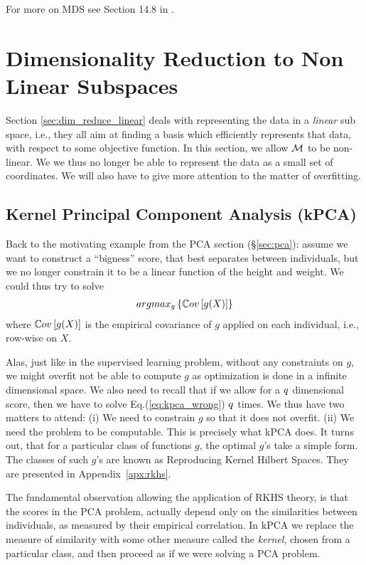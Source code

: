 For more on MDS see Section 14.8 in \cite{hastie_elements_2003}.


\section{Dimensionality Reduction to Non Linear Subspaces}
\label{sec:dim_reduce_nonlinear}

Section \ref{sec:dim_reduce_linear} deals with representing the data in a \emph{linear} sub space, i.e., they all aim at finding a basis which efficiently represents that data, with respect to some objective function. 
In this section, we allow $\mathcal{M}$ to be non-linear. We we thus no longer be able to represent the data as a small set of coordinates. We will also have to give more attention to the matter of overfitting. 

\subsection{Kernel Principal Component Analysis (kPCA)}
\label{sec:kpca}

Back to the motivating example from the PCA section (\S\ref{sec:pca}): assume we want to construct a ``bigness'' score, that best separates between individuals, but we no longer constrain it to be a linear function of the height and weight.
We could thus try to solve 
\begin{align}
\label{eq:kpca_wrong}
	argmax_{g}\left\{ \mathbb{C}ov \left[ g(X) \right] \right\}
\end{align}
where $\mathbb{C}ov \left[ g(X) \right]$ is the empirical covariance of $g$ applied on each individual, i.e., row-wise on $X$.

Alas, just like in the supervised learning problem, without any constraints on $g$, we might overfit \andor not be able to compute $g$ as optimization is done in a infinite dimensional space. 
We also need to recall that if we allow for a $q$ dimensional score, then we have to solve Eq.(\ref{eq:kpca_wrong}) $q$ times.
We thus have two matters to attend:
(i) We need to constrain $g$ so that it does not overfit.
(ii) We need the problem to be computable.
This is precisely what kPCA does. 
It turns out, that for a particular class of functions $g$, the optimal $g$'s take a simple form. 
The classes of such $g$'s are known as Reproducing Kernel Hilbert Spaces. They are presented in Appendix~\ref{apx:rkhs}.

The fundamental observation allowing the application of RKHS theory, is that the scores in the PCA problem, actually depend only on the similarities between individuals, as measured by their empirical correlation. 
In kPCA we replace the measure of similarity with some other measure called the \emph{kernel}, chosen from a particular class, and then proceed as if we were solving a PCA problem.


